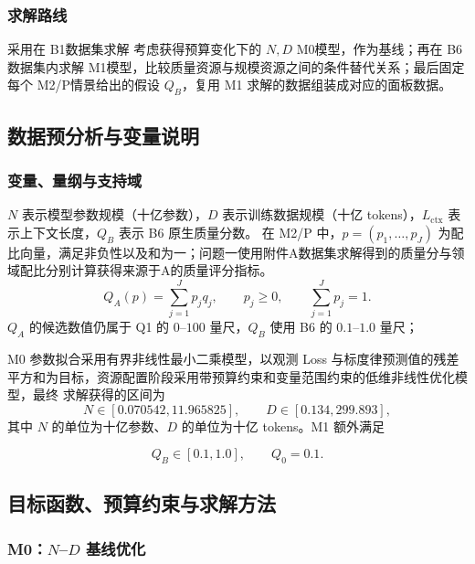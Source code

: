 \subsubsection{求解路线}

采用在 B1数据集求解 考虑获得预算变化下的 $N,D$ M0模型，作为基线；再在 B6数据集内求解 M1模型，比较质量资源与规模资源之间的条件替代关系；最后固定每个 M2/P情景给出的假设 $Q_B$，复用 M1 求解的数据组装成对应的面板数据。

\subsection{数据预分析与变量说明}
\label{sec:q3-data}

\subsubsection{变量、量纲与支持域}

 $N$ 表示模型参数规模（十亿参数），$D$ 表示训练数据规模（十亿
tokens），$L_{\mathrm{ctx}}$ 表示上下文长度，$Q_B$ 表示 B6 原生质量分数。
在 M2/P 中，$p=(p_1,\ldots,p_J)$ 为配比向量，满足非负性以及和为一；问题一使用附件A数据集求解得到的质量分与领域配比分别计算获得来源于A的质量评分指标。
\begin{equation}
  Q_A(p)=\sum_{j=1}^{J}p_jq_j,
  \qquad p_j\geq 0,\qquad \sum_{j=1}^{J}p_j=1.
  \label{eq:q3-qa}
\end{equation}
$Q_A$ 的候选数值仍属于 Q1 的 $0$--$100$ 量尺，$Q_B$ 使用 B6 的
$0.1$--$1.0$ 量尺；

M0 参数拟合采用有界非线性最小二乘模型，以观测 Loss 与标度律预测值的残差平方和为目标，资源配置阶段采用带预算约束和变量范围约束的低维非线性优化模型，最终 求解获得的区间为
\begin{equation}
  N\in[0.070542,11.965825],\qquad
  D\in[0.134,299.893],
  \label{eq:q3-m0-domain}
\end{equation}
其中 $N$ 的单位为十亿参数、$D$ 的单位为十亿 tokens。M1 额外满足

\begin{equation}
  Q_B\in[0.1,1.0],\qquad Q_0=0.1.
  \label{eq:q3-q-domain}
\end{equation}

\subsection{目标函数、预算约束与求解方法}
\label{sec:q3-objective}

\subsubsection{M0：$N$--$D$ 基线优化}

